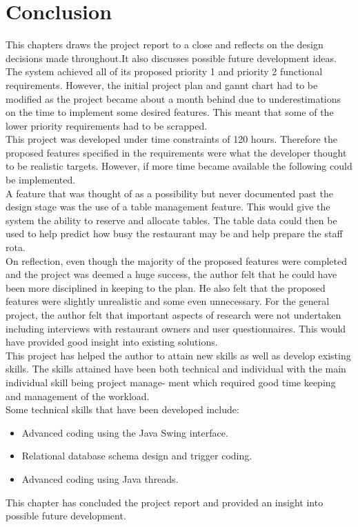 \documentclass[12pt,a4paper]{article}
\newcommand\tab[1][.7cm]{\hspace*{#1}}
\begin{document}
	\section*{Conclusion}
	\tab This chapters draws the project report to a close and reflects on the design decisions made throughout.It also discusses possible future development ideas.\\\tab The system achieved all of its proposed priority 1 and priority 2 functional requirements.
However, the initial project plan and gannt chart had to be modified as the project became about
a month behind due to underestimations on the time to implement some desired features. This meant
that some of the lower priority requirements had to be scrapped.\\\tab This project was developed under time constraints of 120 hours. Therefore the proposed features
specified in the requirements were what the developer thought to be realistic targets.
However, if more time became available the following could be implemented.\\\tab A feature that was thought of as a possibility but never documented past the design stage was the use
of a table management feature. This would give the system the ability to reserve and allocate tables.
The table data could then be used to help predict how busy the restaurant may be and help prepare
the staff rota.\\\tab On reflection, even though the majority of the proposed features were completed and the project was
deemed a huge success, the author felt that he could have been more disciplined in keeping to the plan.
He also felt that the proposed features were slightly unrealistic and some even unnecessary.
For the general project, the author felt that important aspects of research were not undertaken
including interviews with restaurant owners and user questionnaires. This would have provided good
insight into existing solutions.\\\tab This project has helped the author to attain new skills as well as develop existing skills. The skills
attained have been both technical and individual with the main individual skill being project manage-
ment which required good time keeping and management of the workload. \\
Some technical skills that
have been developed include:
	\begin{itemize}
		\item Advanced coding using the Java Swing interface.
		\item Relational database schema design and trigger coding.
		\item Advanced coding using Java threads.
	\end{itemize}\tab This chapter has concluded the project report and provided an insight into possible future development.
\end{document}
